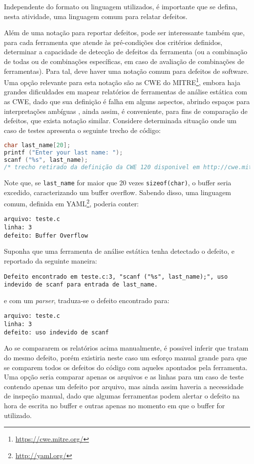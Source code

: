 Independente do formato ou linguagem utilizados, é importante que se defina, nesta atividade, uma linguagem comum para relatar defeitos.

Além de uma notação para reportar defeitos, pode ser interessante também que, para cada ferramenta que atende às pré-condições dos critérios definidos, determinar a capacidade de detecção de defeitos da ferramenta (ou a combinação de todas ou de combinações específicas, em caso de avaliação de combinações de ferramentas). Para tal, deve haver uma notação comum para defeitos de software.  Uma opção relevante para esta notação são as CWE do  MITRE\footnote{\url{https://cwe.mitre.org/}}, embora haja grandes dificuldades em mapear relatórios de ferramentas de análise estática com as CWE, dado que sua definição é falha em alguns aspectos, abrindo espaços para interpretações ambíguas \cite{yan}, ainda assim, é conveniente, para fins de comparação de defeitos, que exista notação similar. Considere determinada situação onde um caso de testes apresenta o seguinte trecho de código:
\begin{lstlisting}[language=C, title=cwe120.c]
char last_name[20];
printf ("Enter your last name: ");
scanf ("%s", last_name);
/* trecho retirado da definição da CWE 120 disponivel em http://cwe.mitre.org/data/definitions/120.html */
\end{lstlisting}
Note que, se \lstinline{last_name} for maior que 20 vezes \lstinline{sizeof(char)}, o buffer seria excedido, caracterizando um buffer overflow. Sabendo disso, uma linguagem comum, definida em YAML\footnote{\url{http://yaml.org/}}, poderia conter:
\begin{lstlisting}
arquivo: teste.c
linha: 3
defeito: Buffer Overflow
\end{lstlisting}

Suponha que uma ferramenta de análise estática tenha detectado o defeito, e reportado da seguinte maneira:
\begin{lstlisting}
Defeito encontrado em teste.c:3, "scanf ("%s", last_name);", uso indevido de scanf para entrada de last_name.
\end{lstlisting}
e com um \textit{parser}, traduza-se o defeito encontrado para:
\begin{lstlisting}
arquivo: teste.c
linha: 3
defeito: uso indevido de scanf
\end{lstlisting}
Ao se compararem os relatórios acima manualmente, é possivel inferir que tratam do mesmo defeito, porém existiria neste caso um esforço manual grande para que se comparem todos os defeitos do código com aqueles apontados pela ferramenta. Uma opção seria comparar apenas os arquivos e as linhas para um caso de teste contendo apenas um defeito por arquivo, mas ainda assim haveria a necessidade de inspeção manual, dado que algumas ferramentas podem alertar o defeito na hora de escrita no buffer e outras apenas no momento em que o buffer for utilizado.

